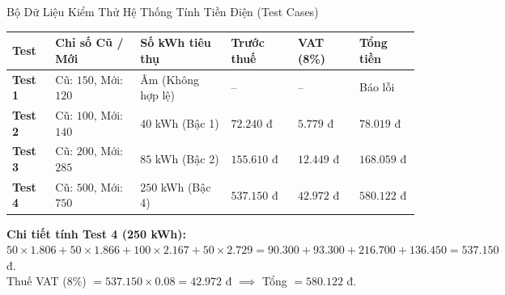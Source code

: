 \documentclass[aspectratio=169, 10pt]{beamer}
\begin{document}
\begin{frame}{Bộ Dữ Liệu Kiểm Thử Hệ Thống Tính Tiền Điện (Test Cases)}
  \begin{table}[h]
    \centering
    \small
    \begin{tabularx}{\textwidth}{lp{3.2cm}p{2.8cm}p{2.2cm}p{2.0cm}X}
      \toprule
      \textbf{Test} & \textbf{Chỉ số Cũ / Mới} & \textbf{Số kWh tiêu thụ} & \textbf{Trước thuế} & \textbf{VAT (8\%)} & \textbf{Tổng tiền} \\
      \midrule
      \textbf{Test 1} & Cũ: $150$, Mới: $120$ & Âm (Không hợp lệ) & -- & -- & Báo lỗi \\
      \addlinespace
      \textbf{Test 2} & Cũ: $100$, Mới: $140$ & $40$ kWh (Bậc 1) & $72.240$ đ & $5.779$ đ & $78.019$ đ \\
      \addlinespace
      \textbf{Test 3} & Cũ: $200$, Mới: $285$ & $85$ kWh (Bậc 2) & $155.610$ đ & $12.449$ đ & $168.059$ đ \\
      \addlinespace
      \textbf{Test 4} & Cũ: $500$, Mới: $750$ & $250$ kWh (Bậc 4) & $537.150$ đ & $42.972$ đ & $580.122$ đ \\
      \bottomrule
    \end{tabularx}
  \end{table}
  \begin{tcolorbox}[colback=UniLightBlue!30,colframe=UniBlue]
    \textbf{Chi tiết tính Test 4 (250 kWh):}
    $50 \times 1.806 + 50 \times 1.866 + 100 \times 2.167 + 50 \times 2.729 = 90.300 + 93.300 + 216.700 + 136.450 = 537.150$ đ.\\
    Thuế VAT ($8\%$) $= 537.150 \times 0.08 = 42.972$ đ $\implies$ Tổng $= 580.122$ đ.
  \end{tcolorbox}
\end{frame}
\end{document}
